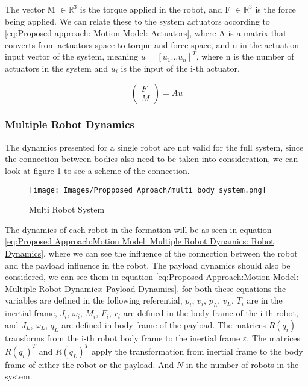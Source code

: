 The vector M $\in \mathbb{R}^{3}$ is the torque applied in the robot, and F $\in \mathbb{R}^3$ is the force being applied. We can relate these to the system actuators according to \ref{eq:Proposed approach: Motion Model: Actuators}, where A is a matrix that converts from actuators space to torque and force space, and u in the actuation input vector of the system, meaning $u = \left[u_{1} \dots  u_{n} \right]^{T}$, where n is the number of actuators in the system and $u_{i}$ is the input of the i-th actuator. 

\begin{equation}
    \begin{pmatrix}
        F \\
        M
    \end{pmatrix} = A u
    \label{eq:Proposed approach: Motion Model: Actuators}
\end{equation}

\subsubsection{Multiple Robot Dynamics}

The dynamics presented for a single robot are not valid for the full system, since the connection between bodies also need to be taken into consideration, we can look at figure \ref{fig:Proposed Approach: Motion Model: Multi Robot System} to see a scheme of the connection.

\begin{figure}[H]
    \centering
    \texttt{[image: Images/Propposed Aproach/multi body system.png]}
    \caption{Multi Robot System}
    \label{fig:Proposed Approach: Motion Model: Multi Robot System}
\end{figure}

The dynamics of each robot in the formation will be as seen in equation \ref{eq:Proposed Approach:Motion Model: Multiple Robot Dynamics: Robot Dynamics}, where we can see the influence of the connection between the robot and the payload influence in the robot. The payload dynamics should also be considered,  we can see them in equation \ref{eq:Proposed Approach:Motion Model: Multiple Robot Dynamics: Payload Dynamics}, for both these equations the variables are defined in the following referential, $p_{i}$, $v_{i}$, $p_ {L}$, $v_{L}$, $T_{i}$ are in the inertial frame, $J_{i}$, $\omega_{i}$, $M_i$, $F_i$, $r_i$ are defined in the body frame of the i-th robot, and $J_{L}$, $\omega_{L}$, $q_L$ are defined in body frame of the payload. The matrices $R(q_{i})$ transforms from the i-th robot body frame to the inertial frame $\varepsilon$. The matrices $R(q_{i})^T$ and $R(q_{L})^T$ apply the transformation from inertial frame to the body frame of either the robot or the payload. And $N$ in the number of robots in the system.


